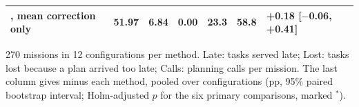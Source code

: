 \begin{table}[t]
\begin{threeparttable}
\begin{tabular}{lrrrrrl}
\mname{}, mean correction only & 51.97 & 6.84 & 0.00 & 23.3 & 58.8 & +0.18 [$-$0.06, +0.41] \\
\bottomrule
\end{tabular}
\begin{tablenotes}[flushleft]\scriptsize
\item[] 270 missions in 12 configurations per method. Late: tasks served late; Lost: tasks lost because a plan arrived too late; Calls: planning calls per mission. The last column gives \mname{} minus each method, pooled over configurations (pp, 95\% paired bootstrap interval; Holm-adjusted $p$ for the six primary comparisons, marked $^{\ast}$).
\end{tablenotes}
\end{threeparttable}
\end{table}
